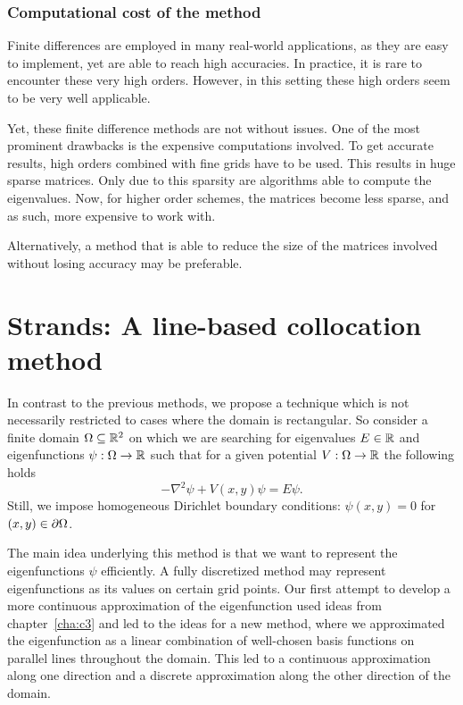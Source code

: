 

\subsubsection{Computational cost of the method}

Finite differences are employed in many real-world applications, as they are easy to implement, yet are able to reach high accuracies. In practice, it is rare to encounter these very high orders. However, in this setting these high orders seem to be very well applicable.

Yet, these finite difference methods are not without issues. One of the most prominent drawbacks is the expensive computations involved. To get accurate results, high orders combined with fine grids have to be used. This results in huge sparse matrices. Only due to this sparsity are algorithms able to compute the eigenvalues. Now, for higher order schemes, the matrices become less sparse, and as such, more expensive to work with.

Alternatively, a method that is able to reduce the size of the matrices involved without losing accuracy may be preferable.

\section[Strands: line-based collocation method]{Strands: A line-based collocation method}\label{sec:c4_strands}

In contrast to the previous methods, we propose a technique which is not necessarily restricted to cases where the domain is rectangular. So consider a finite domain $\Omega \subseteq \mathbb{R}^2$ on which we are searching for eigenvalues $E \in \mathbb{R}$ and eigenfunctions $\psi: \Omega \to \mathbb{R}$ such that for a given potential $V : \Omega \to \mathbb{R}$ the following holds
\begin{equation}\label{equ:c4_schrodinger_equation_new_method}
    -\nabla^2 \psi + V(x, y) \psi = E \psi\text{.}
\end{equation}
Still, we impose homogeneous Dirichlet boundary conditions: $\psi(x, y) = 0$ for $(x, y) \in \partial\Omega$.

The main idea underlying this method is that we want to represent the eigenfunctions $\psi$ efficiently. A fully discretized method may represent eigenfunctions as its values on certain grid points. Our first attempt to develop a more continuous approximation of the eigenfunction used ideas from chapter~\ref{cha:c3} and led to the ideas for a new method, where we approximated the eigenfunction as a linear combination of well-chosen basis functions on parallel lines throughout the domain. This led to a continuous approximation along one direction and a discrete approximation along the other direction of the domain.

